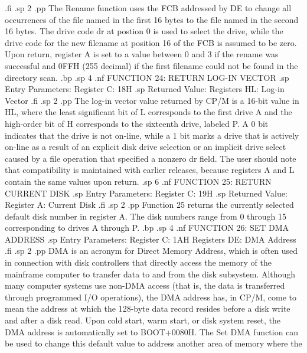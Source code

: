 .fi
.sp 2
.pp
The Rename function uses the FCB addressed by DE to change all 
occurrences of the file named in the first 16 bytes to the file 
named in the second 16 bytes.  The drive code dr at postion 0 is 
used to select the drive, while the drive code for the new 
filename at position 16 of the FCB is assumed to be zero.  Upon 
return, register A is set to a value between 0 and 3 if the 
rename was successful and 0FFH (255 decimal) if the first 
filename could not be found in the directory scan.
.bp
.sp 4
.nf
               FUNCTION 24:  RETURN LOG-IN VECTOR
.sp
               Entry Parameters:
                     Register C:  18H
.sp
               Returned Value:
                   Registers HL:  Log-in Vector
.fi
.sp 2
.pp
The log-in vector value returned by CP/M is a 16-bit value in HL, where the 
least significant bit of L corresponds to the first drive A and 
the high-order bit of H corresponds to the sixteenth drive, 
labeled P.  A 0 bit indicates that the drive is not on-line, 
while a 1 bit marks a drive that is actively on-line as a result 
of an explicit disk drive selection or an implicit drive select 
caused by a file operation that specified a nonzero dr field.  
The user should note that compatibility is maintained with 
earlier releases, because registers A and L contain the same values 
upon return.
.sp 6
.nf
                FUNCTION 25:  RETURN CURRENT DISK
.sp
                Entry Parameters:
                      Register C:  19H
.sp
                Returned Value:
                     Register  A:  Current Disk
.fi
.sp 2
.pp
Function 25 returns the currently selected default disk number in 
register A.  The disk numbers range from 0 through 15 
corresponding to drives A through P.
.bp
.sp 4
.nf
                  FUNCTION 26:  SET DMA ADDRESS
.sp
                Entry Parameters:
                      Register C:  1AH
                    Registers DE:  DMA Address
.fi
.sp 2
.pp
DMA is an acronym for Direct Memory Address, which is often used 
in connection with disk controllers that directly access the 
memory of the mainframe computer to transfer data to and from the 
disk subsystem.  Although many computer systems use non-DMA 
access (that is, the data is transferred through programmed I/O 
operations), the DMA address has, in CP/M, come to mean the 
address at which the 128-byte data record resides before a disk 
write and after a disk read.  Upon cold start, warm start, or 
disk system reset, the DMA address is automatically set to 
BOOT+0080H.  The Set DMA function can be used to change 
this default value to address another area of memory where the 

